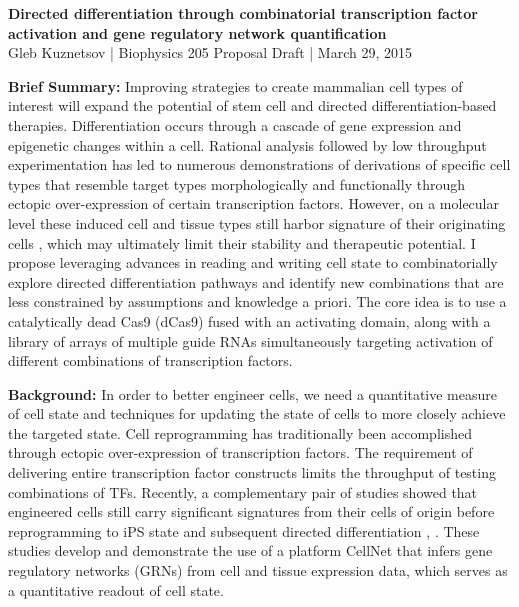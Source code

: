 \documentclass[10pt]{article}
\begin{document}
\thispagestyle{empty}

\begin{flushleft}
    {\Large
        \textbf{Directed differentiation through combinatorial transcription factor activation and gene regulatory network quantification}
    }
    \\
    Gleb Kuznetsov | Biophysics 205 Proposal Draft | March 29, 2015
\end{flushleft}

\textbf{Brief Summary:} Improving strategies to create mammalian cell types of interest will expand the potential of stem cell and directed differentiation-based therapies. Differentiation occurs through a cascade of gene expression and epigenetic changes within a cell. Rational analysis followed by low throughput experimentation has led to numerous demonstrations of derivations of specific cell types that resemble target types morphologically and functionally through ectopic over-expression of certain transcription factors. However, on a molecular level these induced cell and tissue types still harbor signature of their originating cells \cite{cahan2014cellnet}, which may ultimately limit their stability and therapeutic potential. I propose leveraging advances in reading and writing cell state to combinatorially explore directed differentiation pathways and identify new combinations that are less constrained by assumptions and knowledge a priori. The core idea is to use a catalytically dead Cas9 (dCas9) fused with an activating domain, along with a library of arrays of multiple guide RNAs simultaneously targeting activation of different combinations of transcription factors.
\newline

\textbf{Background:} In order to better engineer cells, we need a quantitative measure of cell state and techniques for updating the state of cells to more closely achieve the targeted state. Cell reprogramming has traditionally been accomplished through ectopic over-expression of transcription factors. The requirement of delivering entire transcription factor constructs limits the throughput of testing combinations of TFs. Recently, a complementary pair of studies showed that engineered cells still carry significant signatures from their cells of origin before reprogramming to iPS state and subsequent directed differentiation \cite{morris2014dissecting}, \cite{cahan2014cellnet}. These studies develop and demonstrate the use of a platform CellNet that infers gene regulatory networks (GRNs) \cite{davidson2006gene} from cell and tissue expression data, which serves as a quantitative readout of cell state.
\end{document}
